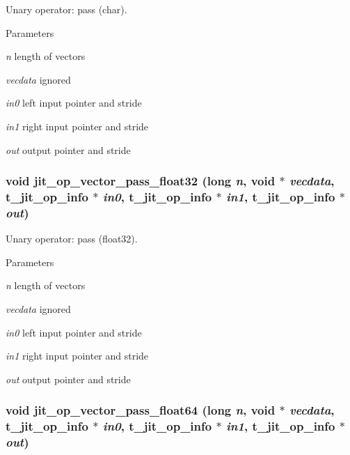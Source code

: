 Unary operator: pass (char). 
\begin{DoxyParams}{Parameters}
\item[{\em n}]length of vectors \item[{\em vecdata}]ignored \item[{\em in0}]left input pointer and stride \item[{\em in1}]right input pointer and stride \item[{\em out}]output pointer and stride \end{DoxyParams}
\hypertarget{group__opvecmod_ga6afcf9e93db2e15454448ce58a1c6217}{
\subsubsection[{jit\_\-op\_\-vector\_\-pass\_\-float32}]{\setlength{\rightskip}{0pt plus 5cm}void jit\_\-op\_\-vector\_\-pass\_\-float32 (long {\em n}, \/  void $\ast$ {\em vecdata}, \/  {\bf t\_\-jit\_\-op\_\-info} $\ast$ {\em in0}, \/  {\bf t\_\-jit\_\-op\_\-info} $\ast$ {\em in1}, \/  {\bf t\_\-jit\_\-op\_\-info} $\ast$ {\em out})}}
\label{group__opvecmod_ga6afcf9e93db2e15454448ce58a1c6217}


Unary operator: pass (float32). 
\begin{DoxyParams}{Parameters}
\item[{\em n}]length of vectors \item[{\em vecdata}]ignored \item[{\em in0}]left input pointer and stride \item[{\em in1}]right input pointer and stride \item[{\em out}]output pointer and stride \end{DoxyParams}
\hypertarget{group__opvecmod_ga1de814c8a85b052f304e5403c82a8b29}{
\subsubsection[{jit\_\-op\_\-vector\_\-pass\_\-float64}]{\setlength{\rightskip}{0pt plus 5cm}void jit\_\-op\_\-vector\_\-pass\_\-float64 (long {\em n}, \/  void $\ast$ {\em vecdata}, \/  {\bf t\_\-jit\_\-op\_\-info} $\ast$ {\em in0}, \/  {\bf t\_\-jit\_\-op\_\-info} $\ast$ {\em in1}, \/  {\bf t\_\-jit\_\-op\_\-info} $\ast$ {\em out})}}
\label{group__opvecmod_ga1de814c8a85b052f304e5403c82a8b29}


